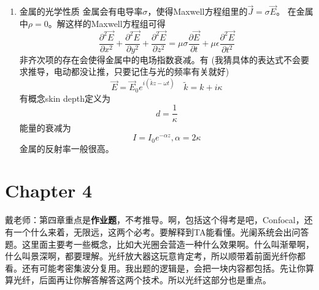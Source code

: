 \documentclass{ctexart}
\begin{document}
\begin{enumerate}
\item 金属的光学性质
金属会有电导率$\sigma$，使得Maxwell方程组里的$\vec{J}=\sigma \vec{E}$。 在金属中$\rho=0$。解这样的Maxwell方程组可得
\begin{equation}
\frac{\partial^{2} \vec{E}}{\partial x^{2}}+\frac{\partial^{2} \vec{E}}{\partial y^{2}}+\frac{\partial^{2} \vec{E}}{\partial z^{2}}=\mu \sigma \frac{\partial \vec{E}}{\partial t}+\mu \epsilon \frac{\partial^{2} \vec{E}}{\partial t^{2}}
\end{equation}
非齐次项的存在会使得金属中的电场指数衰减。有 (我猜具体的表达式不会要求推导，电动都没让推，只要记住与光的频率有关就好)
\begin{equation}
\vec{E}=\vec{E}_{0} e^{i(\tilde{k} z-\omega t)} \quad \tilde{k}=k+i \kappa
\end{equation}
有概念skin depth定义为
\begin{equation}
d=\frac{1}{\kappa}
\end{equation}
能量的衰减为
\begin{equation}
I=I_{0} e^{-\alpha z},\alpha=2\kappa
\end{equation}
金属的反射率一般很高。

\end{enumerate}
\section{Chapter 4}
戴老师：第四章重点是\textbf{作业题}，不考推导。啊，包括这个得考是吧，Confocal，还有一个什么来着，无限远，这两个必考。要解释到TA能看懂。光阑系统会出问答题。这里面主要考一些概念，比如大光圈会营造一种什么效果啊。什么叫渐晕啊，什么叫景深啊，都要理解。光纤放大器这玩意肯定考，所以顺带着前面光纤你都看。还有可能考密集波分复用。我出题的逻辑是，会把一块内容都包括。先让你算算光纤，后面再让你解答解答这两个技术。所以光纤这部分也是重点。\\
\end{document}
